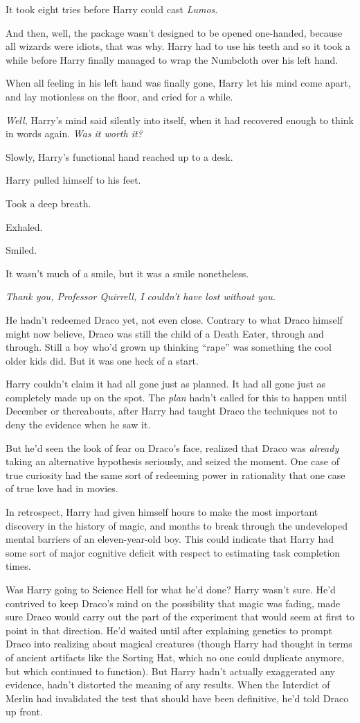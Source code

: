It took eight tries before Harry could cast \emph{Lumos.}

And then, well, the package wasn't designed to be opened one-handed,
because all wizards were idiots, that was why. Harry had to use his
teeth and so it took a while before Harry finally managed to wrap the
Numbcloth over his left hand.

When all feeling in his left hand was finally gone, Harry let his mind
come apart, and lay motionless on the floor, and cried for a while.

\emph{Well,} Harry's mind said silently into itself, when it had
recovered enough to think in words again. \emph{Was it worth it?}

Slowly, Harry's functional hand reached up to a desk.

Harry pulled himself to his feet.

Took a deep breath.

Exhaled.

Smiled.

It wasn't much of a smile, but it was a smile nonetheless.

\emph{Thank you, Professor Quirrell, I couldn't have lost without you.}

He hadn't redeemed Draco yet, not even close. Contrary to what Draco
himself might now believe, Draco was still the child of a Death Eater,
through and through. Still a boy who'd grown up thinking ``rape'' was
something the cool older kids did. But it was one heck of a start.

Harry couldn't claim it had all gone just as planned. It had all gone
just as completely made up on the spot. The \emph{plan} hadn't called
for this to happen until December or thereabouts, after Harry had taught
Draco the techniques not to deny the evidence when he saw it.

But he'd seen the look of fear on Draco's face, realized that Draco was
\emph{already} taking an alternative hypothesis seriously, and seized
the moment. One case of true curiosity had the same sort of redeeming
power in rationality that one case of true love had in movies.

In retrospect, Harry had given himself hours to make the most important
discovery in the history of magic, and months to break through the
undeveloped mental barriers of an eleven-year-old boy. This could
indicate that Harry had some sort of major cognitive deficit with
respect to estimating task completion times.

Was Harry going to Science Hell for what he'd done? Harry wasn't sure.
He'd contrived to keep Draco's mind on the possibility that magic was
fading, made sure Draco would carry out the part of the experiment that
would seem at first to point in that direction. He'd waited until after
explaining genetics to prompt Draco into realizing about magical
creatures (though Harry had thought in terms of ancient artifacts like
the Sorting Hat, which no one could duplicate anymore, but which
continued to function). But Harry hadn't actually exaggerated any
evidence, hadn't distorted the meaning of any results. When the
Interdict of Merlin had invalidated the test that should have been
definitive, he'd told Draco up front.


